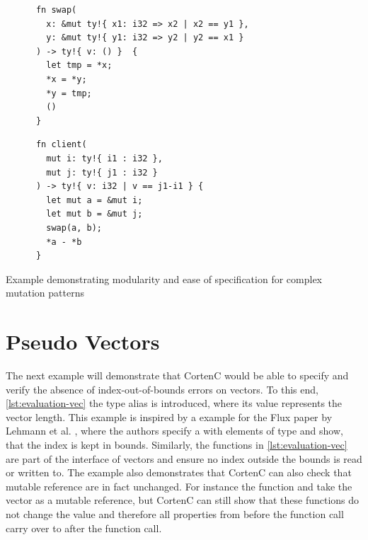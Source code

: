 \documentclass[twoside, english, final]{sdqthesis}
\theoremstyle{definition}
\begin{document}
\begin{listing}[h]
  \begin{minipage}[t]{0.52\linewidth}
    \begin{verbatim}
      fn swap(
        x: &mut ty!{ x1: i32 => x2 | x2 == y1 },
        y: &mut ty!{ y1: i32 => y2 | y2 == x1 }
      ) -> ty!{ v: () }  {
        let tmp = *x;
        *x = *y;
        *y = tmp;
        ()
      }
    \end{verbatim}
  \end{minipage}
  \begin{minipage}[t]{0.5\linewidth}
    \begin{verbatim}
      fn client(
        mut i: ty!{ i1 : i32 },
        mut j: ty!{ j1 : i32 }
      ) -> ty!{ v: i32 | v == j1-i1 } {
        let mut a = &mut i;
        let mut b = &mut j;
        swap(a, b);
        *a - *b
      }
    \end{verbatim}
  \end{minipage}

  \caption{Example demonstrating modularity and ease of specification for complex mutation patterns}
  \label{lst:evaluation-swap}
\end{listing}

\section{Pseudo Vectors}

The next example will demonstrate that CortenC would be able to specify and verify the absence of index-out-of-bounds errors on vectors. To this end, \cref{lst:evaluation-vec} the type alias  is introduced, where its value represents the vector length. This example is inspired by a example for the Flux paper by Lehmann et al. \cite{lehmann_flux_2022}, where the authors specify a  with elements of type  and show, that the index is kept in bounds.
Similarly, the functions in \cref{lst:evaluation-vec} are part of the interface of vectors and ensure no index outside the bounds is read or written to.
The example also demonstrates that CortenC can also check that mutable reference are in fact unchanged. For instance the function  and  take the vector  as a mutable reference, but CortenC can still show that these functions do not change the value and therefore all properties from before the function call carry over to after the function call.
\end{document}
